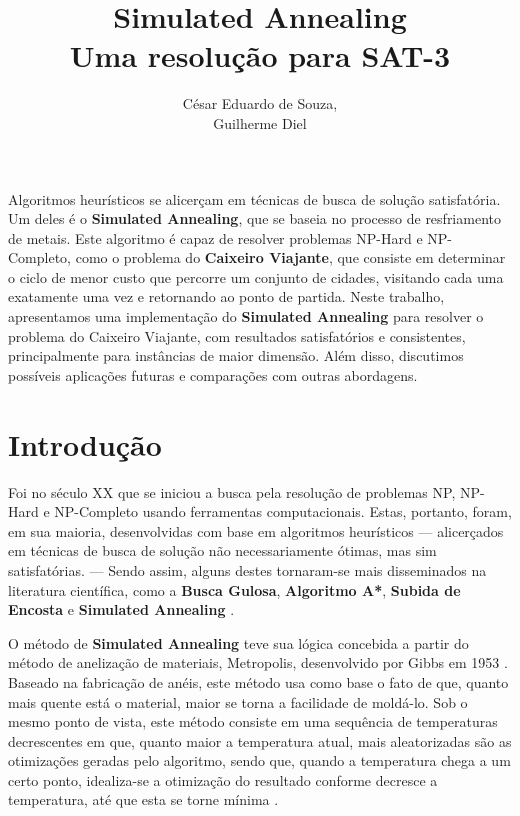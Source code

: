 \documentclass[12pt]{article}
\title{Simulated Annealing\\ Uma resolução para SAT-3}
\author{César Eduardo de Souza\inst{1},\\ Guilherme Diel\inst{1}}
\begin{document}
 

\maketitle

     
\begin{resumo} 
  Algoritmos heurísticos se alicerçam em técnicas de busca de solução satisfatória. Um deles é o \textbf{Simulated Annealing}, que se baseia no processo de resfriamento de metais. Este algoritmo é capaz de resolver problemas NP-Hard e NP-Completo, como o problema do \textbf{Caixeiro Viajante}, que consiste em determinar o ciclo de menor custo que percorre um conjunto de cidades, visitando cada uma exatamente uma vez e retornando ao ponto de partida. Neste trabalho, apresentamos uma implementação do \textbf{Simulated Annealing} para resolver o problema do Caixeiro Viajante, com resultados satisfatórios e consistentes, principalmente para instâncias de maior dimensão. Além disso, discutimos possíveis aplicações futuras e comparações com outras abordagens.
\end{resumo}


\section{Introdução}
\label{sec:introducao}
Foi no século XX que se iniciou a busca pela resolução de problemas NP, NP-Hard e NP-Completo usando ferramentas computacionais. 
%
Estas, portanto, foram, em sua maioria, desenvolvidas com base em algoritmos heurísticos — alicerçados em técnicas de busca de solução não necessariamente ótimas, mas sim satisfatórias. — 
%
Sendo assim, alguns destes tornaram-se mais disseminados na literatura científica, como a \textbf{Busca Gulosa}, \textbf{Algoritmo A*}, \textbf{Subida de Encosta} e \textbf{Simulated Annealing} \cite{kokashHeuristicIntro}.

O método de \textbf{Simulated Annealing} teve sua lógica concebida a partir do método de anelização de materiais, Metropolis, desenvolvido por Gibbs em 1953 \cite{metropolis1953equation}.
%
Baseado na fabricação de anéis, este método usa como base o fato de que, quanto mais quente está o material, maior se torna a facilidade de moldá-lo.%
Sob o mesmo ponto de vista, este método consiste em uma sequência de temperaturas decrescentes em que, quanto maior a temperatura atual, mais aleatorizadas são as otimizações geradas pelo algoritmo, sendo que, quando a temperatura chega a um certo ponto, idealiza-se a otimização do resultado conforme decresce a temperatura, até que esta se torne mínima \cite{bertsimas1993simulated}.
\end{document}
